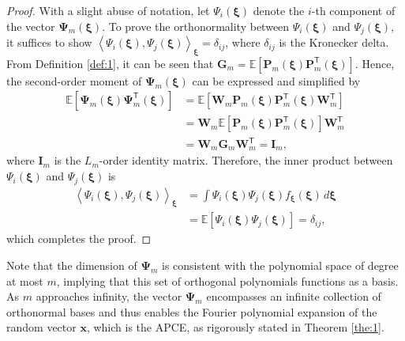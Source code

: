 \documentclass[journal]{IEEEtran}
\theoremstyle{definition}
\theoremstyle{remark}
\begin{document}
\begin{proof}
With a slight abuse of notation, let $\Psi_i(\boldsymbol{\xi})$ denote the $i$-th component of the vector $\boldsymbol{\Psi}_m(\boldsymbol{\xi})$. To prove the orthonormality between $\Psi_i(\boldsymbol{\xi})$ and $\Psi_j(\boldsymbol{\xi})$, it suffices to show $\left\langle \Psi_i(\boldsymbol{\xi}), \Psi_j(\boldsymbol{\xi}) \right\rangle_{\boldsymbol{\xi}}=\delta_{ij}$, where $\delta_{ij}$ is the Kronecker delta. 
From Definition \ref{def:1}, it can be seen that $\boldsymbol{G}_m=\mathbb{E}\left[\boldsymbol{P}_m(\boldsymbol{\xi})\boldsymbol{P}_m^{\mathsf{T}}(\boldsymbol{\xi})\right]$. Hence, the second-order moment of $\boldsymbol{\Psi}_m(\boldsymbol{\xi})$ can be expressed and simplified by
\begin{equation}\label{eq:14}
\begin{split}
    \mathbb{E}\left[\boldsymbol{\Psi}_m(\boldsymbol{\xi})\boldsymbol{\Psi}_m^{\mathsf{T}}(\boldsymbol{\xi})\right]
    & = \mathbb{E}\left[\boldsymbol{W}_m\boldsymbol{P}_m(\boldsymbol{\xi})\boldsymbol{P}_m^{\mathsf{T}}(\boldsymbol{\xi})\boldsymbol{W}_m^{\mathsf{T}}\right] \\
    & = \boldsymbol{W}_m\mathbb{E}\left[\boldsymbol{P}_m(\boldsymbol{\xi})\boldsymbol{P}_m^{\mathsf{T}}(\boldsymbol{\xi})\right]\boldsymbol{W}_m^{\mathsf{T}} \\
    & = \boldsymbol{W}_m\boldsymbol{G}_m\boldsymbol{W}_m^{\mathsf{T}} = \boldsymbol{I}_m,
    \end{split}
\end{equation}
where $\boldsymbol{I}_m$ is the $L_{m}$-order identity matrix. Therefore, the inner product between $\Psi_i(\boldsymbol{\xi})$ and $\Psi_j(\boldsymbol{\xi})$ is
\begin{equation}
\begin{split}
        \left\langle \Psi_i(\boldsymbol{\xi}), \Psi_j(\boldsymbol{\xi}) \right\rangle_{\boldsymbol{\xi}}& = \int \Psi_i(\boldsymbol{\xi})\Psi_j(\boldsymbol{\xi})f_{\boldsymbol{\xi}}(\boldsymbol{\xi}) \, d\boldsymbol{\xi}\\
        & = \mathbb{E}\left[\Psi_i(\boldsymbol{\xi})\Psi_j(\boldsymbol{\xi})\right]=\delta_{ij},
\end{split}
\end{equation}
which completes the proof.
\end{proof}
Note that the dimension of $\boldsymbol{\Psi}_m$ is consistent with the polynomial space of degree at most $m$, implying that this set of orthogonal polynomials functions as a basis. As $m$ approaches infinity, the vector $\boldsymbol{\Psi}_m$ encompasses an infinite collection of orthonormal bases and thus enables the Fourier polynomial expansion of the random vector $\boldsymbol{x}$, which is the APCE, as rigorously stated in Theorem \ref{the:1}.
\end{document}
